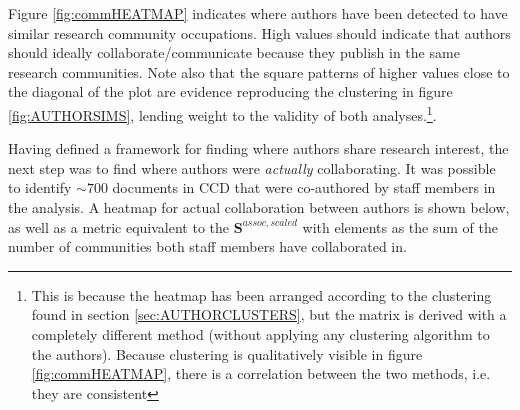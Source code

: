 Figure \ref{fig:commHEATMAP} indicates where authors have been detected to have similar research community occupations. High values should indicate that authors should ideally collaborate/communicate because they publish in the same research communities. Note also that the square patterns of higher values close to the diagonal of the plot are evidence reproducing the clustering in figure \ref{fig:AUTHORSIMS}, lending weight to the validity of both analyses.\footnote{This is because the heatmap has been arranged according to the clustering found in section \ref{sec:AUTHORCLUSTERS}, but the matrix is derived with a completely different method (without applying any clustering algorithm to the authors). Because clustering is qualitatively visible in figure \ref{fig:commHEATMAP}, there is a correlation between the two methods, i.e. they are consistent}.

Having defined a framework for finding where authors share research interest, the next step was to find where authors were \emph{actually} collaborating. It was possible to identify $\sim 700$ documents in CCD that were co-authored by staff members in the analysis. A heatmap for actual collaboration between authors is shown below, as well as a metric equivalent to the $\mathbf{S}^{assoc,scaled}$ with elements as the sum of the number of communities both staff members have collaborated in.

